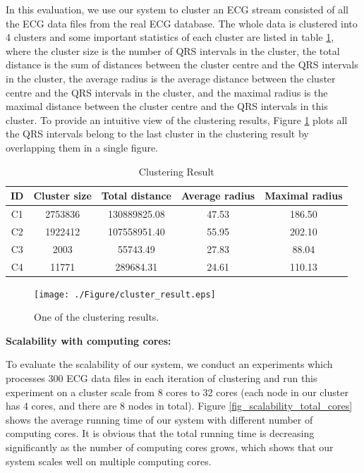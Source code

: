 \documentclass[conference]{IEEEtran}
\begin{document}
In this evaluation, we use our system to cluster an ECG stream consisted of all the ECG data files from the real ECG database. The whole data is clustered into 4 clusters and some important statistics of each cluster are listed in table \ref{tb_clustering_result}, where the cluster size is the number of QRS intervals in the cluster, the total distance is the sum of distances between the cluster centre and the QRS intervals in the cluster, the average radius is the average distance between the cluster centre and the QRS intervals in the cluster, and the maximal radius is the maximal distance between the cluster centre and the QRS intervals in this cluster. To provide an intuitive view of the clustering results, Figure \ref{fig_clustering_result} plots all the QRS intervals belong to the last cluster in the clustering result by overlapping them in a single figure.
\begin{table}[!t]\caption{Clustering Result}
\label{tb_clustering_result}
\centering
\begin{tabular}{|c|c|c|c|c|}
\hline
ID & Cluster size & Total distance & Average radius & Maximal radius\\
\hline
C1 & 2753836 & 130889825.08 & 47.53 & 186.50 \\
C2 & 1922412 & 107558951.40 & 55.95 & 202.10 \\
C3 & 2003 & 55743.49 & 27.83 & 88.04 \\
C4 & 11771 & 289684.31 & 24.61 & 110.13 \\
\hline
\end{tabular}
\end{table}

\begin{figure}[!t]
\centering
\texttt{[image: ./Figure/cluster\_result.eps]}
\caption{One of the clustering results.}
\label{fig_clustering_result}
\end{figure}

\textbf{Scalability with computing cores:}


To evaluate the scalability of our system, we conduct an experiments which processes 300 ECG data files in each iteration of clustering and run this experiment on a cluster scale from 8 cores to 32 cores (each node in our cluster has 4 cores, and there are 8 nodes in total). Figure \ref{fig_scalability_total_cores} shows the average running time of our system with different number of computing cores. It is obvious that the total running time is decreasing significantly as the number of computing cores grows, which shows that our system scales well on multiple computing cores. 
\end{document}
